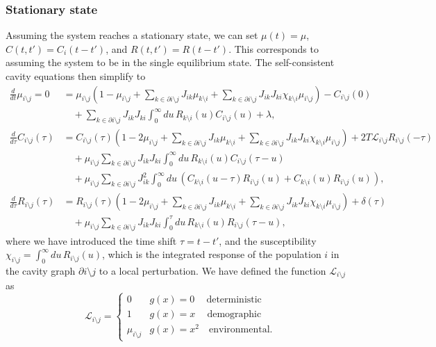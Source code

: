 \documentclass[
    preprint,
    linenumbers,
    amsmath,amssymb,amsfonts,
    aps, physrev,
    superscriptaddress,
    10pt,
    bibnotes
    ]{revtex4-2}
\begin{document}
\subsubsection{Stationary state}
Assuming the system reaches a stationary state, we can set $\mu(t)=\mu$, $C(t,t')=C_{i}(t-t')$, and $R(t,t')=R(t-t')$. This corresponds to assuming the system to be in the single equilibrium state. The self-consistent cavity equations then simplify to
\begin{align}
  \frac{d}{dt}\mu_{i\setminus j} = 0 & = \mu_{i\setminus j}\left(1 - \mu_{i\setminus j} + \sum_{k\in\partial i\setminus j}J_{ik}\mu_{k\setminus i} + \sum_{k\in \partial i \setminus j}J_{ik}J_{ki}\chi_{k\setminus i}\mu_{i\setminus j} \right)-C_{i\setminus j}(0)\nonumber \\
  &\quad + \sum_{k\in \partial i\setminus j}J_{ik}J_{ki}\int_0^{\infty}du\, R_{k\setminus i}(u)C_{i\setminus j}(u) + \lambda,\\
  \frac{d}{d\tau}C_{i\setminus j}(\tau) & = C_{i\setminus j}(\tau)\left( 1 - 2\mu_{i\setminus j} + \sum_{k\in\partial i\setminus j}J_{ik}\mu_{k\setminus i} + \sum_{k\in \partial i \setminus j}J_{ik}J_{ki}\chi_{k\setminus i}\mu_{i\setminus j}\right) + 2T\mathcal{L}_{i\setminus j}R_{i\setminus j}(-\tau) \nonumber\\
  & \quad + \mu_{i\setminus j}\sum_{k\in \partial i\setminus j} J_{ik} J_{ki} \int_0^\infty du\, R_{k\setminus i}(u)C_{i\setminus j}(\tau-u) \nonumber \\
  &\quad + \mu_{i\setminus j}\sum_{k\in \partial i\setminus j} J_{ik}^2 \int_0^\infty du \, \left(C_{k\setminus i}(u-\tau) R_{i\setminus j}(u) + C_{k\setminus i}(u) R_{i\setminus j}(u)\right),\\
  \frac{d}{d\tau}R_{i\setminus j}(\tau) & = R_{i\setminus j}(\tau)\left( 1 - 2\mu_{i\setminus j} + \sum_{k\in\partial i\setminus j}J_{ik}\mu_{k\setminus i} + \sum_{k\in \partial i \setminus j}J_{ik}J_{ki}\chi_{k\setminus i}\mu_{i\setminus j}\right) + \delta(\tau) \nonumber\\
  & \quad + \mu_{i\setminus j} \sum_{k\in \partial i\setminus j} J_{ik}J_{ki} \int_0^\tau du \, R_{k\setminus i}(u)R_{i\setminus j}(\tau-u),
\end{align}
where we have introduced the time shift $\tau=t-t'$, and the susceptibility $\chi_{i\setminus j}=\int_0^\infty du\, R_{i\setminus j}(u)$, which is the integrated response of the population $i$ in the cavity graph $\partial i \setminus j$ to a local perturbation. We have defined the function $\mathcal{L}_{i\setminus j}$ as
\begin{equation}
  \mathcal{L}_{i\setminus j} = \begin{cases}
    0 & g(x) = 0 \quad \ \text{deterministic}\\
    1 & g(x) = x \quad \ \text{demographic}\\
    \mu_{i\setminus j} & g(x) = x^2 \quad \text{environmental}.
  \end{cases}
\end{equation}
\end{document}
